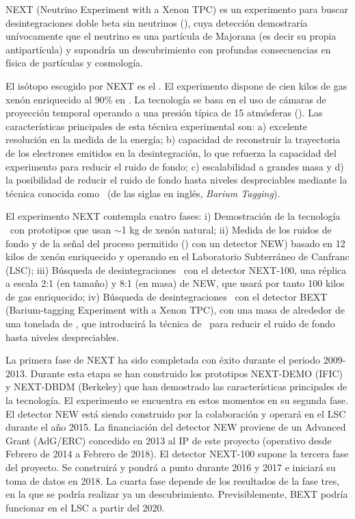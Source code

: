 
NEXT (Neutrino Experiment with a Xenon TPC) es un experimento para buscar desintegraciones doble beta sin neutrinos (\bbonu), cuya detección demostraría unívocamente que el neutrino es una partícula de Majorana (es decir su propia antipartícula) y supondría un descubrimiento con profundas consecuencias en física de partículas y cosmología. 

 El isótopo escogido por NEXT es el \XE. El experimento dispone de cien kilos de gas xenón enriquecido al 90\% en \XE. La tecnología se basa en el uso de cámaras de proyección temporal operando a una presión típica de 15 atmósferas (\HPXE). Las características principales de esta técnica experimental son: a) excelente resolución en la medida de la energía; b) capacidad de reconstruir la trayectoria de los electrones emitidos en la desintegración, lo que refuerza la capacidad del experimento para reducir el ruido de fondo; c) escalabilidad a grandes masa y d) la posibilidad de reducir el ruido de fondo hasta niveles despreciables mediante la técnica conocida como \BATA\ (de las siglas en inglés, {\em Barium Tagging}).

 El experimento NEXT contempla cuatro fases: i) Demostración de la tecnología \HPXE\ con prototipos que usan $\sim$1 kg de xenón natural; ii) Medida de los ruidos de fondo y de la señal del proceso permitido (\bbtnu) con un detector NEW) basado en 12 kilos de xenón enriquecido y operando en el Laboratorio Subterráneo de Canfranc (LSC); iii) Búsqueda de desintegraciones \bbonu\ con el detector NEXT-100, una réplica a escala 2:1 (en tamaño) y 8:1 (en masa) de NEW, que usará por tanto 100 kilos de gas enriquecido; iv) Búsqueda de desintegraciones \bbonu\ con el detector BEXT (Barium-tagging Experiment with a Xenon TPC), con una masa de alrededor de una tonelada de \XE, que introducirá la técnica de \BATA\ para reducir el ruido de fondo hasta niveles despreciables. 

La primera fase de NEXT ha sido completada con éxito durante el periodo 2009-2013. Durante esta etapa se han construido los prototipos NEXT-DEMO (IFIC) y NEXT-DBDM (Berkeley) que han demostrado las características principales de la tecnología. El experimento se encuentra en estos momentos en su segunda fase. El detector NEW está siendo construido por la colaboración y operará en el LSC durante el año 2015. La financiación del detector NEW proviene de un Advanced Grant (AdG/ERC) concedido en 2013 al IP de este proyecto (operativo desde Febrero de 2014 a Febrero de 2018). El detector NEXT-100 supone la tercera fase del proyecto. Se construirá y pondrá a punto durante 2016 y 2017 e iniciará su toma de datos en 2018. La cuarta fase depende de los resultados de la fase tres, en la que se podría realizar ya un descubrimiento. Previsiblemente, BEXT podría funcionar en el LSC a partir del 2020. 

